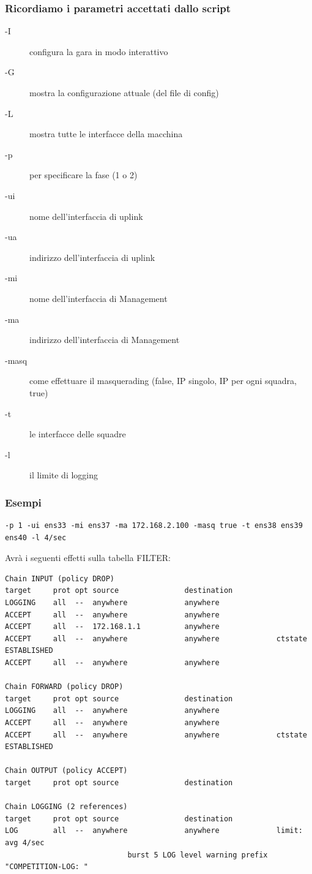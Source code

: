 \documentclass{beamer}
\begin{document}
\begin{frame}
    \frametitle{Ricordiamo i parametri accettati dallo script}
    \begin{description}
        \item[-I] configura la gara in modo interattivo
        \item[-G] mostra la configurazione attuale (del file di config)
        \item[-L] mostra tutte le interfacce della macchina
        \item[-p] per specificare la fase (1 o 2)
        \item[-ui] nome dell'interfaccia di uplink
        \item[-ua] indirizzo dell'interfaccia di uplink
        \item[-mi] nome dell'interfaccia di Management
        \item[-ma] indirizzo dell'interfaccia di Management
        \item[-masq] come effettuare il masquerading (false, IP singolo, IP per ogni squadra, true)
        \item[-t] le interfacce delle squadre
        \item[-l] il limite di logging
    \end{description}
\end{frame}

\begin{frame}[fragile]
    \frametitle{Esempi}
    \begin{lstlisting}
-p 1 -ui ens33 -mi ens37 -ma 172.168.2.100 -masq true -t ens38 ens39 ens40 -l 4/sec
    \end{lstlisting}
    Avrà i seguenti effetti sulla tabella FILTER:
    \begin{lstlisting}
Chain INPUT (policy DROP)
target     prot opt source               destination         
LOGGING    all  --  anywhere             anywhere            
ACCEPT     all  --  anywhere             anywhere            
ACCEPT     all  --  172.168.1.1          anywhere            
ACCEPT     all  --  anywhere             anywhere             ctstate ESTABLISHED
ACCEPT     all  --  anywhere             anywhere            

Chain FORWARD (policy DROP)
target     prot opt source               destination         
LOGGING    all  --  anywhere             anywhere            
ACCEPT     all  --  anywhere             anywhere            
ACCEPT     all  --  anywhere             anywhere             ctstate ESTABLISHED

Chain OUTPUT (policy ACCEPT)
target     prot opt source               destination         

Chain LOGGING (2 references)
target     prot opt source               destination         
LOG        all  --  anywhere             anywhere             limit: avg 4/sec 
                            burst 5 LOG level warning prefix "COMPETITION-LOG: "
    \end{lstlisting}
\end{frame}
\end{document}
